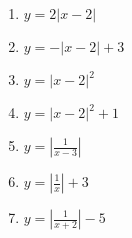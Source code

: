 \documentclass[algebra,twocolumn]{pum}
\begin{document}
\begin{exercises}
\begin{question}
\begin{multicols}{2}
      \begin{enumerate}[label=\arabic*)]
        \item $y=2|x-2|$
        \item $y=-|x-2|+3$
        \item $y=|x-2|^2$
        \item $y=|x-2|^2+1$
        \item $y=\left|\frac{1}{x-3}\right|$
        \item $y=\left|\frac{1}{x}\right|+3$
        \item $y=\left|\frac{1}{x+2}\right|-5$
      \end{enumerate}
    \end{multicols}
  \end{question}
\end{exercises}
\end{document}
